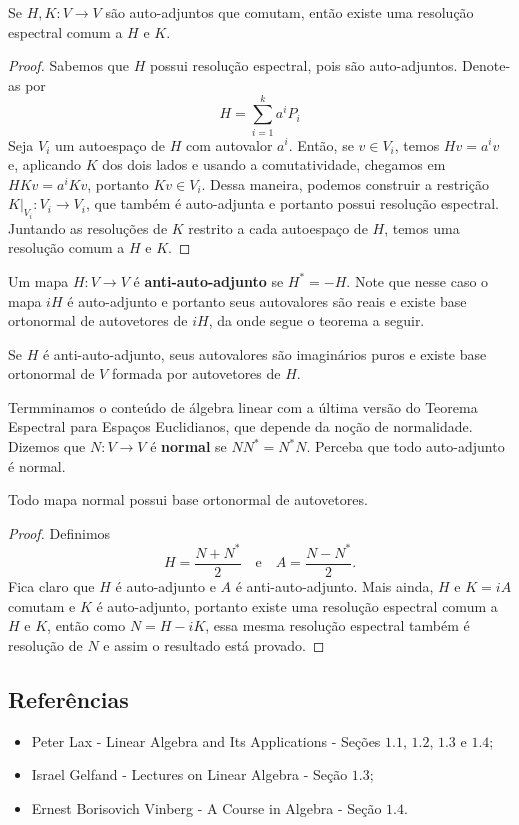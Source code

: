 \begin{theorem}
    Se $H, K \colon V \to V$ são auto-adjuntos que comutam, então existe uma resolução espectral comum a $H$ e $K$.
\end{theorem}
\begin{proof}
    Sabemos que $H$ possui resolução espectral, pois são auto-adjuntos. Denote-as por \begin{equation}
        H = \sum_{i = 1}^k a^i P_i
    \end{equation} Seja $V_i$ um autoespaço de $H$ com autovalor $a^i$. Então, se $v \in V_i$, temos $Hv = a^iv$ e, aplicando $K$ dos dois lados e usando a comutatividade, chegamos em $HKv = a^iKv$, portanto $Kv \in V_i$. Dessa maneira, podemos construir a restrição $K|_{V_i} \colon V_i \to V_i$, que também é auto-adjunta e portanto possui resolução espectral. Juntando as resoluções de $K$ restrito a cada autoespaço de $H$, temos uma resolução comum a $H$ e $K$.
\end{proof}

Um mapa $H \colon V \to V$ é \textbf{anti-auto-adjunto} se $H^* = -H$. Note que nesse caso o mapa $iH$ é auto-adjunto e portanto seus autovalores são reais e existe base ortonormal de autovetores de $iH$, da onde segue o teorema a seguir.

\begin{theorem}
    Se $H$ é anti-auto-adjunto, seus autovalores são imaginários puros e existe base ortonormal de $V$ formada por autovetores de $H$.
\end{theorem}

Termminamos o conteúdo de álgebra linear com a última versão do Teorema Espectral para Espaços Euclidianos, que depende da noção de normalidade. Dizemos que $N \colon V \to V$ é \textbf{normal} se $NN^* = N^*N$. Perceba que todo auto-adjunto é normal.

\begin{theorem}
    Todo mapa normal possui base ortonormal de autovetores.
\end{theorem}
\begin{proof}
    Definimos \begin{equation}
        H = \frac{N + N^*}{2} \quad \text{e} \quad A = \frac{N - N^*}{2}.
    \end{equation} Fica claro que $H$ é auto-adjunto e $A$ é anti-auto-adjunto. Mais ainda, $H$ e $K = iA$ comutam e $K$ é auto-adjunto, portanto existe uma resolução espectral comum a $H$ e $K$, então como $N = H - iK$, essa mesma resolução espectral também é resolução de $N$ e assim o resultado está provado.
\end{proof}

\subsection{Referências}
\begin{itemize}
    \item Peter Lax - Linear Algebra and Its Applications - Seções $1.1$, $1.2$, $1.3$ e $1.4$;
    \item Israel Gelfand - Lectures on Linear Algebra - Seção $1.3$;
    \item Ernest Borisovich Vinberg - A Course in Algebra - Seção $1.4$.
\end{itemize}